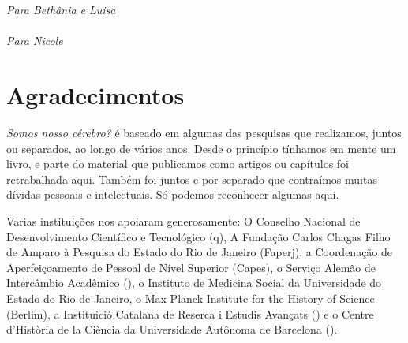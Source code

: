 






\chapter*{}

\vspace*{\fill}

\begin{flushright}
\emph{Para Bethânia e Luisa\\
\\
Para Nicole\\
}
\end{flushright}

\chapter{Agradecimentos}

\emph{Somos nosso cérebro?} é baseado em algumas das pesquisas que
realizamos, juntos ou separados, ao longo de vários anos. Desde o
princípio tínhamos em mente um livro, e parte do material que publicamos
como artigos ou capítulos foi retrabalhada aqui. Também foi juntos e por
separado que contraímos muitas dívidas pessoais e intelectuais. Só
podemos reconhecer algumas aqui.

Varias instituições nos apoiaram generosamente: O Conselho Nacional de
Desenvolvimento Científico e Tecnológico (q), A Fundação Carlos
Chagas Filho de Amparo à Pesquisa do Estado do Rio de Janeiro (Faperj),
a Coordenação de Aperfeiçoamento de Pessoal de Nível Superior (Capes), o
Serviço Alemão de Intercâmbio Acadêmico (), o Instituto de Medicina
Social da Universidade do Estado do Rio de Janeiro, o Max Planck
Institute for the History of Science (Berlim), a Instituició Catalana de
Reserca i Estudis Avançats () e o Centre d'Història de la Ciència
da Universidade Autônoma de Barcelona ().


